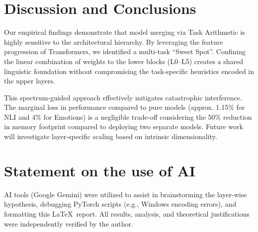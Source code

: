 \documentclass{article}
\begin{document}
\section{Discussion and Conclusions}

Our empirical findings demonstrate that model merging via Task Arithmetic is highly sensitive to the architectural hierarchy. By leveraging the feature progression of Transformers, we identified a multi-task ``Sweet Spot''. Confining the linear combination of weights to the lower blocks (L0--L5) creates a shared linguistic foundation without compromising the task-specific heuristics encoded in the upper layers.

This spectrum-guided approach effectively mitigates catastrophic interference. The marginal loss in performance compared to pure models (approx. 1.15\% for NLI and 4\% for Emotions) is a negligible trade-off considering the 50\% reduction in memory footprint compared to deploying two separate models. Future work will investigate layer-specific scaling based on intrinsic dimensionality.

\section*{Statement on the use of AI}
\begin{small}
AI tools (Google Gemini) were utilized to assist in brainstorming the layer-wise hypothesis, debugging PyTorch scripts (e.g., Windows encoding errors), and formatting this \LaTeX\ report. All results, analysis, and theoretical justifications were independently verified by the author.
\end{small}

\vspace{-2mm}
\begin{small}


\end{small}
\end{document}
